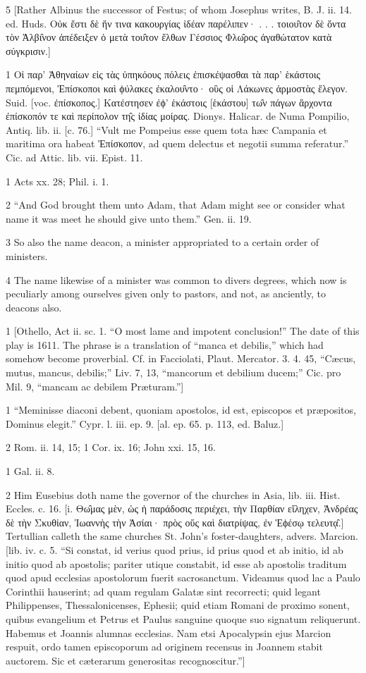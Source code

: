 5
[Rather Albinus the successor of Festus; of whom Josephus writes, B. J. ii. 14. ed. Huds. Οὐκ ἔστι δὲ ἥν τινα κακουργίας ἰδέαν παρέλιπεν· . . . τοιου̑τον δὲ ὄντα τὸν Ἀλβι̑νον ἀπέδειξεν ὁ μετὰ του̑τον ἔλθων Γέσσιος Φλω̑ρος ἀγαθώτατον κατὰ σύγκρισιν.]

1
Οἱ παρ’ Ἀθηναίων εἰς τὰς ὑπηκόους πόλεις ἐπισκέψασθαι τὰ παρ’ ἑκάστοις πεμπόμενοι, Ἐπίσκοποι καὶ ϕύλακες ἐκαλου̑ντο· οὓς οἱ Λάκωνες ἁρμοστὰς ἔλεγον. Suid. [voc. ἐπίσκοπος.] Κατέστησεν ἐϕ’ ἑκάστοις [ἑκάστου] τω̑ν πάγων ἄρχοντα ἐπίσκοπόν τε καὶ περίπολον τη̑ς ἰδίας μοίρας. Dionys. Halicar. de Numa Pompilio, Antiq. lib. ii. [c. 76.] “Vult me Pompeius esse quem tota hæc Campania et maritima ora habeat Ἐπίσκοπον, ad quem delectus et negotii summa referatur.” Cic. ad Attic. lib. vii. Epist. 11.

1
Acts xx. 28; Phil. i. 1.

2
“And God brought them unto Adam, that Adam might see or consider what name it was meet he should give unto them.” Gen. ii. 19.

3
So also the name deacon, a minister appropriated to a certain order of ministers.

4
The name likewise of a minister was common to divers degrees, which now is peculiarly among ourselves given only to pastors, and not, as anciently, to deacons also.

1
[Othello, Act ii. sc. 1. “O most lame and impotent conclusion!” The date of this play is 1611. The phrase is a translation of “manca et debilis,” which had somehow become proverbial. Cf. in Facciolati, Plaut. Mercator. 3. 4. 45, “Cæcus, mutus, mancus, debilis;” Liv. 7, 13, “mancorum et debilium ducem;” Cic. pro Mil. 9, “mancam ac debilem Præturam.”]

1
“Meminisse diaconi debent, quoniam apostolos, id est, episcopos et præpositos, Dominus elegit.” Cypr. l. iii. ep. 9. [al. ep. 65. p. 113, ed. Baluz.]

2
Rom. ii. 14, 15; 1 Cor. ix. 16; John xxi. 15, 16.

1
Gal. ii. 8.

2
Him Eusebius doth name the governor of the churches in Asia, lib. iii. Hist. Eccles. c. 16. [i. Θω̑μας μὲν, ὡς ἡ παράδοσις περιέχει, τὴν Παρθίαν εἴληχεν, Ἀνδρέας δὲ τὴν Σκυθἰαν, Ἰωαννὴς τὴν Ἀσίαι· πρὸς οὕς καὶ διατρίψας, ἐν Ἐϕέσῳ τελευτᾳ̑.] Tertullian calleth the same churches St. John’s foster-daughters, advers. Marcion. [lib. iv. c. 5. “Si constat, id verius quod prius, id prius quod et ab initio, id ab initio quod ab apostolis; pariter utique constabit, id esse ab apostolis traditum quod apud ecclesias apostolorum fuerit sacrosanctum. Videamus quod lac a Paulo Corinthii hauserint; ad quam regulam Galatæ sint recorrecti; quid legant Philippenses, Thessalonicenses, Ephesii; quid etiam Romani de proximo sonent, quibus evangelium et Petrus et Paulus sanguine quoque suo signatum reliquerunt. Habemus et Joannis alumnas ecclesias. Nam etsi Apocalypsin ejus Marcion respuit, ordo tamen episcoporum ad originem recensus in Joannem stabit auctorem. Sic et cæterarum generositas recognoscitur.”]

